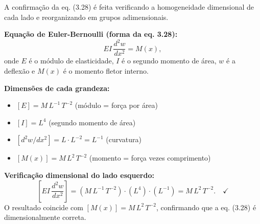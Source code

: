 A confirmação da eq. (3.28) é feita verificando a homogeneidade dimensional de cada lado e reorganizando em grupos adimensionais.

\textbf{Equação de Euler-Bernoulli (forma da eq. 3.28):}
\[
EI\,\frac{d^2w}{dx^2} = M(x),
\]
onde $E$ é o módulo de elasticidade, $I$ é o segundo momento de área, $w$ é a deflexão e $M(x)$ é o momento fletor interno.

\textbf{Dimensões de cada grandeza:}
\begin{itemize}
\item $[E] = M\,L^{-1}\,T^{-2}$ (módulo = força por área)
\item $[I] = L^{4}$ (segundo momento de área)
\item $[d^2w/dx^2] = L\cdot L^{-2} = L^{-1}$ (curvatura)
\item $[M(x)] = M\,L^{2}\,T^{-2}$ (momento = força vezes comprimento)
\end{itemize}

\textbf{Verificação dimensional do lado esquerdo:}
\[
\left[EI\,\frac{d^2w}{dx^2}\right] = (M\,L^{-1}\,T^{-2})\cdot(L^4)\cdot(L^{-1}) = M\,L^{2}\,T^{-2}.\quad\checkmark
\]
O resultado coincide com $[M(x)] = M\,L^{2}\,T^{-2}$, confirmando que a eq. (3.28) é dimensionalmente correta.

